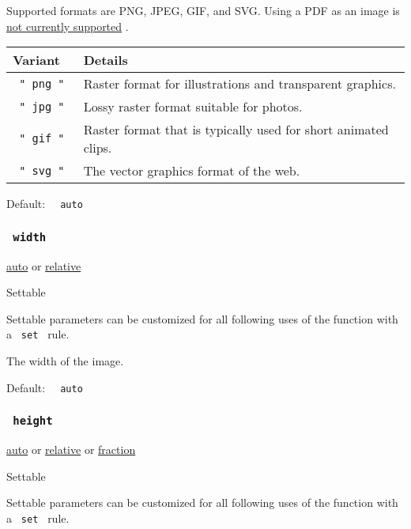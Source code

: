 Supported formats are PNG, JPEG, GIF, and SVG. Using a PDF as an image
is \href{https://github.com/typst/typst/issues/145}{not currently
supported} .

\begin{longtable}[]{@{}ll@{}}
\toprule\noalign{}
Variant & Details \\
\midrule\noalign{}
\endhead
\bottomrule\noalign{}
\endlastfoot
\texttt{\ "\ png\ "\ } & Raster format for illustrations and transparent
graphics. \\
\texttt{\ "\ jpg\ "\ } & Lossy raster format suitable for photos. \\
\texttt{\ "\ gif\ "\ } & Raster format that is typically used for short
animated clips. \\
\texttt{\ "\ svg\ "\ } & The vector graphics format of the web. \\
\end{longtable}

Default: \texttt{\ }{\texttt{\ auto\ }}\texttt{\ }

\subsubsection{\texorpdfstring{\texttt{\ width\ }}{ width }}\label{parameters-width}

\href{/docs/reference/foundations/auto/}{auto} {or}
\href{/docs/reference/layout/relative/}{relative}

{{ Settable }}

\label{parameters-width-settable-tooltip}
Settable parameters can be customized for all following uses of the
function with a \texttt{\ set\ } rule.

The width of the image.

Default: \texttt{\ }{\texttt{\ auto\ }}\texttt{\ }

\subsubsection{\texorpdfstring{\texttt{\ height\ }}{ height }}\label{parameters-height}

\href{/docs/reference/foundations/auto/}{auto} {or}
\href{/docs/reference/layout/relative/}{relative} {or}
\href{/docs/reference/layout/fraction/}{fraction}

{{ Settable }}

\label{parameters-height-settable-tooltip}
Settable parameters can be customized for all following uses of the
function with a \texttt{\ set\ } rule.


